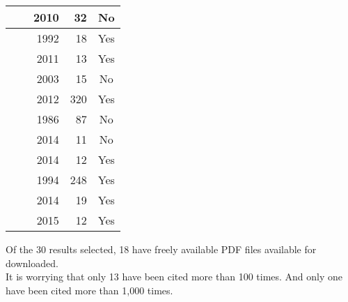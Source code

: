 \begin{tabular}{|c|c|r|r|c|}
	\hline 
    \cite{godkin2010zone} & & 2010 & 32 & No \\
	\hline 
    \cite{bromley1992vested} & & 1992 & 18 & Yes \\
	\hline 
    \cite{majid2011organizational} & & 2011 & 13 & Yes \\
	\hline 
    \cite{buchta2003technological} & & 2003 & 15 & No \\
	\hline 
    \cite{besson2012strategizing} & & 2012 & 320 & Yes \\
	\hline 
    \cite{hannan1986uncertainty} & & 1986 & 87 & No \\
	\hline 
    \cite{haag2014organizational} & & 2014 & 11 & No \\
	\hline 
    \cite{nedzinskas2014dynamic} & & 2014 & 12 & Yes \\
	\hline 
    \cite{reger1994creating} &  &  1994 & 248 & Yes \\
	\hline 
    \cite{chen2014revisiting} & & 2014 & 19 & Yes \\
	\hline 
    \cite{hung2015sustained} & & 2015 & 12 & Yes \\
	\hline 
\end{tabular} 



Of the 30 results selected, 18 have freely available PDF files available for downloaded.\\

It is worrying that only 13 have been cited more than 100 times. And only one have been cited more than 1,000 times.\\
